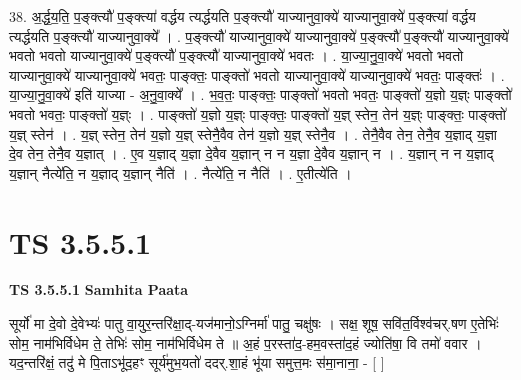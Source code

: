 \documentclass[17pt]{extarticle}
\begin{document}
38. अ॒र्द्ध॒य॒ति॒ प॒ङ्क्त्यौ॑ प॒ङ्क्त्या॑ वर्द्धय त्यर्द्धयति प॒ङ्क्त्यौ॑ याज्यानुवा॒क्ये॑ याज्यानुवा॒क्ये॑ प॒ङ्क्त्या॑ वर्द्धय त्यर्द्धयति प॒ङ्क्त्यौ॑ याज्यानुवा॒क्ये᳚ । . प॒ङ्क्त्यौ॑ याज्यानुवा॒क्ये॑ याज्यानुवा॒क्ये॑ प॒ङ्क्त्यौ॑ प॒ङ्क्त्यौ॑ याज्यानुवा॒क्ये॑ भवतो भवतो याज्यानुवा॒क्ये॑ प॒ङ्क्त्यौ॑ प॒ङ्क्त्यौ॑ याज्यानुवा॒क्ये॑ भवतः । . या॒ज्या॒नु॒वा॒क्ये॑ भवतो भवतो याज्यानुवा॒क्ये॑ याज्यानुवा॒क्ये॑ भवतः॒ पाङ्क्तः॒ पाङ्क्तो॑ भवतो याज्यानुवा॒क्ये॑ याज्यानुवा॒क्ये॑ भवतः॒ पाङ्क्तः॑ । . या॒ज्या॒नु॒वा॒क्ये॑ इति॑ याज्या - अ॒नु॒वा॒क्ये᳚ । . भ॒व॒तः॒ पाङ्क्तः॒ पाङ्क्तो॑ भवतो भवतः॒ पाङ्क्तो॑ य॒ज्ञो य॒ज्ञ्ः पाङ्क्तो॑ भवतो भवतः॒ पाङ्क्तो॑ य॒ज्ञ्ः । . पाङ्क्तो॑ य॒ज्ञो य॒ज्ञ्ः पाङ्क्तः॒ पाङ्क्तो॑ य॒ज्ञ् स्तेन॒ तेन॑ य॒ज्ञ्ः पाङ्क्तः॒ पाङ्क्तो॑ य॒ज्ञ् स्तेन॑ । . य॒ज्ञ् स्तेन॒ तेन॑ य॒ज्ञो य॒ज्ञ् स्तेनै॒वैव तेन॑ य॒ज्ञो य॒ज्ञ् स्तेनै॒व । . तेनै॒वैव तेन॒ तेनै॒व य॒ज्ञाद् य॒ज्ञा दे॒व तेन॒ तेनै॒व य॒ज्ञात् । . ए॒व य॒ज्ञाद् य॒ज्ञा दे॒वैव य॒ज्ञान् न न य॒ज्ञा दे॒वैव य॒ज्ञान् न । . य॒ज्ञान् न न य॒ज्ञाद् य॒ज्ञान् नैत्ये॑ति॒ न य॒ज्ञाद् य॒ज्ञान् नैति॑ । . नैत्ये॑ति॒ न नैति॑ । . ए॒तीत्ये॑ति । \newline
\pagebreak
{}

\section{ TS 3.5.5.1 }

\textbf{TS 3.5.5.1 } \newline
\textbf{Samhita Paata} \newline

सूर्यो॑ मा दे॒वो दे॒वेभ्यः॑ पातु वा॒युर॒न्तरि॑क्षा॒द्-यज॑मानो॒ऽग्निर्मा॑ पातु॒ चक्षु॑षः । सक्ष॒ शूष॒ सवि॑त॒र्विश्व॑चर्.षण ए॒तेभिः॑ सोम॒ नाम॑भिर्विधेम ते॒ तेभिः॑ सोम॒ नाम॑भिर्विधेम ते ॥ अ॒हं प॒रस्ता॑द॒-हम॒वस्ता॑द॒हं ज्योति॑षा॒ वि तमो॑ ववार । यद॒न्तरि॑क्षं॒ तदु॑ मे पि॒ताऽभू॑द॒हꣳ सूर्य॑मुभ॒यतो॑ ददर्.शा॒हं भू॑या समुत्त॒मः स॑मा॒नाना॒ - [  ] \newline
\end{document}
